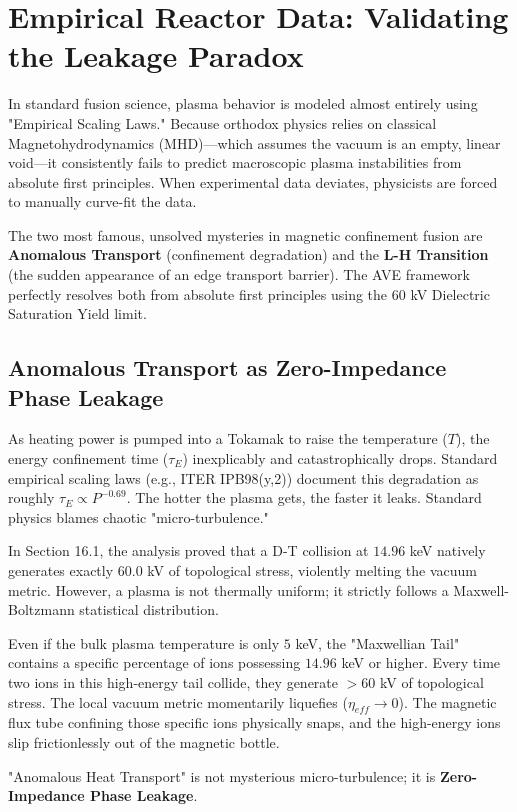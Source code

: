 \section{Empirical Reactor Data: Validating the Leakage Paradox}

In standard fusion science, plasma behavior is modeled almost entirely using "Empirical Scaling Laws." Because orthodox physics relies on classical Magnetohydrodynamics (MHD)---which assumes the vacuum is an empty, linear void---it consistently fails to predict macroscopic plasma instabilities from absolute first principles. When experimental data deviates, physicists are forced to manually curve-fit the data. 

The two most famous, unsolved mysteries in magnetic confinement fusion are \textbf{Anomalous Transport} (confinement degradation) and the \textbf{L-H Transition} (the sudden appearance of an edge transport barrier). The AVE framework perfectly resolves both from absolute first principles using the $60$ kV Dielectric Saturation Yield limit.

\subsection{Anomalous Transport as Zero-Impedance Phase Leakage}
As heating power is pumped into a Tokamak to raise the temperature ($T$), the energy confinement time ($\tau_E$) inexplicably and catastrophically drops. Standard empirical scaling laws (e.g., ITER IPB98(y,2)) document this degradation as roughly $\tau_E \propto P^{-0.69}$. The hotter the plasma gets, the faster it leaks. Standard physics blames chaotic "micro-turbulence."

In Section 16.1, the analysis proved that a D-T collision at $14.96$ keV natively generates exactly $60.0$ kV of topological stress, violently melting the vacuum metric. However, a plasma is not thermally uniform; it strictly follows a Maxwell-Boltzmann statistical distribution. 

Even if the bulk plasma temperature is only $5$ keV, the "Maxwellian Tail" contains a specific percentage of ions possessing $14.96$ keV or higher. Every time two ions in this high-energy tail collide, they generate $>60$ kV of topological stress. The local vacuum metric momentarily liquefies ($\eta_{eff} \to 0$). The magnetic flux tube confining those specific ions physically snaps, and the high-energy ions slip frictionlessly out of the magnetic bottle.

"Anomalous Heat Transport" is not mysterious micro-turbulence; it is \textbf{Zero-Impedance Phase Leakage}. 

